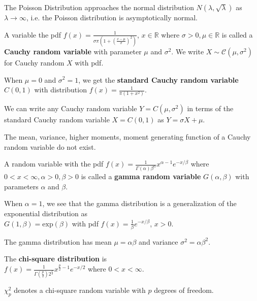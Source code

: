 \begin{prop}
    The Poisson Distribution approaches the normal distribution $N(\lambda, \sqrt{\lambda})$ as $\lambda \to \infty$, i.e. the Poisson distribution is asymptotically normal.
\end{prop}

\begin{defn}
    A variable the pdf $f(x) = \displaystyle \frac{1}{\sigma \pi (1 + \left( \frac{x - \mu}{\sigma} \right)^2 )}$, $x \in \mathbb{R}$ where $\sigma > 0, \mu \in \mathbb{R}$ is called a \textbf{Cauchy random variable} with parameter $\mu$ and $\sigma^2$.
    We write $X \sim \mathcal{C}(\mu, \sigma^2)$ for Cauchy random $X$ with pdf.
\end{defn}

\begin{defn}
    When $\mu = 0$ and $\sigma^2 = 1$, we get the \textbf{standard Cauchy random variable} $C(0,1)$ with distribution $f(x) = \displaystyle \frac{1}{\pi (1 + x^2)}$.
\end{defn}

We can write any Cauchy random variable $Y = C(\mu, \sigma^2)$ in terms of the standard Cauchy random variable $X = C(0,1)$ as $Y = \sigma X + \mu$.

\begin{prop}
The mean, variance, higher moments, moment generating function of a Cauchy random variable do not exist.
\end{prop}

\begin{defn}
    A random variable with the pdf $f(x) = \displaystyle  \frac{1}{\Gamma(\alpha) \beta^\alpha} x^{\alpha - 1} e^{-x/\beta}$ where $0 < x < \infty, \alpha > 0, \beta > 0$ is called a \textbf{gamma random variable} $G(\alpha, \beta)$ with parameters $\alpha$ and $\beta$.
\end{defn}
\begin{prop}
    When $\alpha=1$, we see that the gamma distribution is a generalization of the exponential distribution as \\
$G(1, \beta) = \text{exp}(\beta)$ with pdf $f(x) = \frac{1}{\beta} e^{-x/\beta}$, $x > 0$.
\end{prop}

\begin{prop}
The gamma distribution has mean $\mu = \alpha \beta$ and variance $\sigma^2 = \alpha \beta^2$.
\end{prop}

\begin{defn}
    The \textbf{chi-square distribution} is \\
    $f(x) = \displaystyle \frac{1}{\Gamma(\frac{p}{2}) 2^{\frac{p}{2}}} x^{\frac{p}{2} - 1} e ^{-x/2}$ where $0 < x < \infty$.

    \vspace{0.5cm}
    $\chi_p^2$ denotes a chi-square random variable with $p$ degrees of freedom.
\end{defn}

